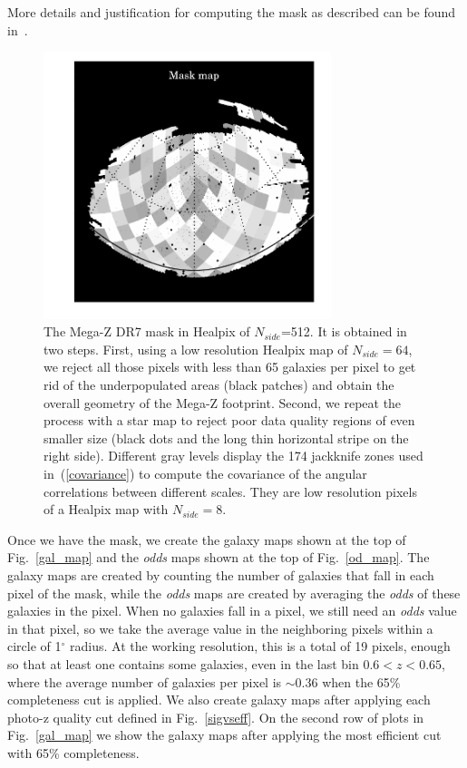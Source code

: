 More details and justification for computing the mask as described can be found in~\citet{Cabre2009}.
\begin{figure}
\centering
\includegraphics[width=84mm]{./plots/mask_map_plot.pdf}
\caption{The Mega-Z DR7 mask in Healpix of $N_{side}$=512. It is obtained in two steps. First, using a low resolution Healpix map of $N_{side}=64$, we reject all those pixels with less than 65 galaxies per pixel to get rid of the underpopulated areas (black patches) and obtain the overall geometry of the Mega-Z footprint. Second, we repeat the process with a star map to reject poor data quality regions of even smaller size (black dots and the long thin horizontal stripe on the right side). Different gray levels display the 174 jackknife zones used in~(\ref{covariance}) to compute the covariance of the angular correlations between different scales. They are low resolution pixels of a Healpix map with $N_{side} = 8$.}
\label{mask_map}
\end{figure}

Once we have the mask, we create the galaxy maps shown at the top of Fig.~\ref{gal_map} and the \textit{odds} maps shown at the top of Fig.~\ref{od_map}. The galaxy maps are created by counting the number of galaxies that fall in each pixel of the mask, while the \textit{odds} maps are created by averaging the \textit{odds} of these galaxies in the pixel. When no galaxies fall in a pixel, we still need an \textit{odds} value in that pixel, so we take the average value in the neighboring pixels within a circle of 1$^\circ$ radius. At the working resolution, this is a total of 19 pixels, enough so that at least one contains some galaxies, even in the last bin $0.6<z<0.65$, where the average number of galaxies per pixel is $\sim 0.36$ when the 65\% completeness cut is applied. We also create galaxy maps after applying each photo-z quality cut defined in Fig.~\ref{sigvseff}. On the second row of plots in Fig.~\ref{gal_map} we show the galaxy maps after applying the most efficient cut with 65\% completeness. 


